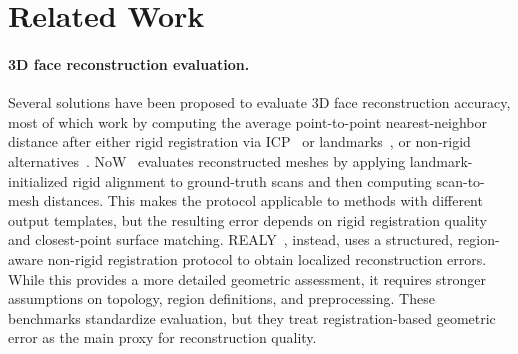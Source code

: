\documentclass[10pt,twocolumn,letterpaper]{article}
\begin{document}


\section{Related Work}
\label{sec:related_work}
\paragraph{3D face reconstruction evaluation.}
Several solutions have been proposed to evaluate 3D face reconstruction accuracy, most of which work by computing the average point-to-point nearest-neighbor distance after either rigid registration via ICP~\cite{jackson17,deng2019accurate,gecer2019ganfit,gecer2021fast,genova18,Bai_2021_CVPR, prnet, feng2018evaluation, sariyanidi20, shang20} or landmarks~\cite{liu2018disentangling,zhu2020beyond}, or non-rigid alternatives~\cite{ferrari2021sparse,booth20163d,gilani2017dense}.
NoW~\cite{now} evaluates reconstructed meshes by applying landmark-initialized rigid alignment to ground-truth scans and then computing scan-to-mesh distances. This makes the protocol applicable to methods with different output templates, but the resulting error depends on rigid registration quality and closest-point surface matching. 
REALY~\cite{REALY}, instead, uses a structured, region-aware non-rigid registration protocol to obtain localized reconstruction errors. While this provides a more detailed geometric assessment, it requires stronger assumptions on topology, region definitions, and preprocessing. These benchmarks standardize evaluation, but they treat registration-based geometric error as the main proxy for reconstruction quality.
\end{document}

